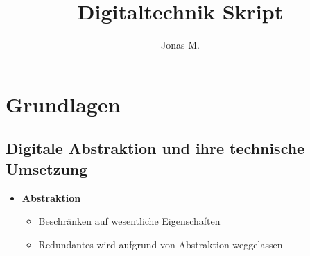 \documentclass[11pt,a4paper]{article}
\title{Digitaltechnik Skript}
\author{Jonas M.}
\date{}
\begin{document}
\maketitle
\tableofcontents
\pagebreak




\section{Grundlagen}
\subsection{Digitale Abstraktion und ihre technische Umsetzung}
\begin{itemize}

\item \textbf{Abstraktion}
	\begin{itemize}
	\item Beschränken auf wesentliche Eigenschaften
	\item Redundantes wird aufgrund von Abstraktion weggelassen
	\end{itemize}


\end{itemize}
\end{document}
